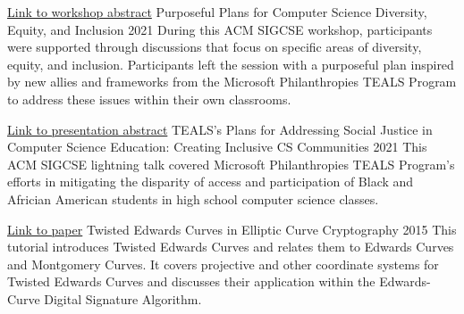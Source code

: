 \begin{cventries}
%
\cventry
     {\href{https://dl.acm.org/doi/10.1145/3408877.3439529}{Link to workshop abstract}}
    {Purposeful Plans for Computer Science Diversity, Equity, and Inclusion}
    {}
    {2021}
    {During this ACM SIGCSE workshop, participants were supported through discussions that focus on specific areas of diversity, equity, and inclusion. Participants left the session with a purposeful plan inspired by new allies and frameworks from the Microsoft Philanthropies TEALS Program to address these issues within their own classrooms.
    }

\cventry
     {\href{https://dl.acm.org/doi/10.1145/3408877.3439559}{Link to presentation abstract}}
    {TEALS's Plans for Addressing Social Justice in Computer Science Education: Creating Inclusive CS Communities}
    {}
    {2021}
    {This ACM SIGCSE lightning talk covered Microsoft Philanthropies TEALS Program's efforts in mitigating the disparity of access and participation of Black and Africian American students in high school computer science classes.
    }

\cventry
     {\href{https://www.semanticscholar.org/paper/Tutorial-of-Twisted-Edwards-Curves-in-Elliptic-Barnard/8eb88f622c8648aa40c2b60171da9d46c2414d5f}{Link to paper}}
    {Twisted Edwards Curves in Elliptic Curve Cryptography}
    {}
    {2015}
    {
         This tutorial introduces Twisted Edwards Curves and relates them to Edwards Curves and Montgomery Curves. It covers projective and other coordinate systems for Twisted Edwards Curves and discusses their application within the Edwards-Curve Digital Signature Algorithm.
    }


\end{cventries}
